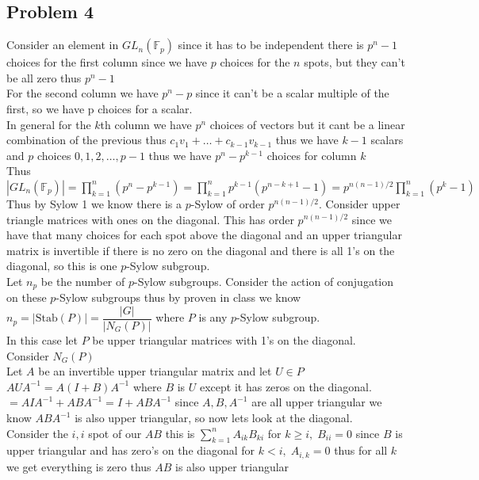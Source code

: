 \documentclass[12pt,letterpaper]{article}
\theoremstyle{definition}
\begin{document}
\newpage
\subsection*{Problem 4}
Consider an element in $GL_n(\mathbb{F}_p)$ since it has to be independent there is $p^n-1$ choices for the first column since we have $p$ choices for the $n$ spots, but they can't be all zero thus $p^n-1$\\
For the second column we have $p^n-p$ since it can't be a scalar multiple of the first, so we have p choices for a scalar.\\
In general for the $k$th column we have $p^n$ choices of vectors but it cant be a linear combination of the previous thus $c_1v_1+\dots+c_{k-1}v_{k-1}$ thus we have $k-1$ scalars and $p$ choices $0,1,2,\dots, p-1$ thus we have $p^n-p^{k-1}$ choices for column $k$\\
Thus $|GL_n(\mathbb{F}_p)|=\prod\limits_{k=1}^n(p^n-p^{k-1})=\prod\limits_{k=1}^np^{k-1}(p^{n-k+1}-1)=p^{n(n-1)/2}\prod\limits_{k=1}^n(p^k-1)$\\
Thus by Sylow 1 we know there is a $p$-Sylow of order $p^{n(n-1)/2}$. Consider upper triangle matrices with ones on the diagonal. This has order $p^{n(n-1)/2}$ since we have that many choices for each spot above the diagonal and an upper triangular matrix is invertible if there is no zero on the diagonal and there is all 1's on the diagonal, so this is one $p$-Sylow subgroup.\\
Let $n_p$ be the number of $p$-Sylow subgroups. Consider the action of conjugation on these $p$-Sylow subgroups thus by proven in class we know $n_p=|\text{Stab} (P)|=\dfrac{|G|}{|N_G(P)|}$ where $P$ is any $p$-Sylow subgroup.\\
In this case let $P$ be upper triangular matrices with 1's on the diagonal.\\
Consider $N_G(P)$\\
Let $A$ be an invertible upper triangular matrix and let $U \in P$\\
$AUA^{-1}=A(I+B)A^{-1}$ where $B$ is $U$ except it has zeros on the diagonal.\\
$=AIA^{-1}+ABA^{-1}=I+ABA^{-1}$ since $A,B,A^{-1}$ are all upper triangular we know $ABA^{-1}$ is also upper triangular, so now lets look at the diagonal.\\
Consider the $i,i$ spot of our $AB$ this is $\sum\limits_{k=1}^nA_{ik}B_{ki}$ for $k\geq i,\;B_{ii}=0$ since $B$ is upper triangular and has zero's on the diagonal for $k<i,\; A_{i,k}=0$ thus for all $k$ we get everything is zero thus $AB$ is also upper triangular
\end{document}
